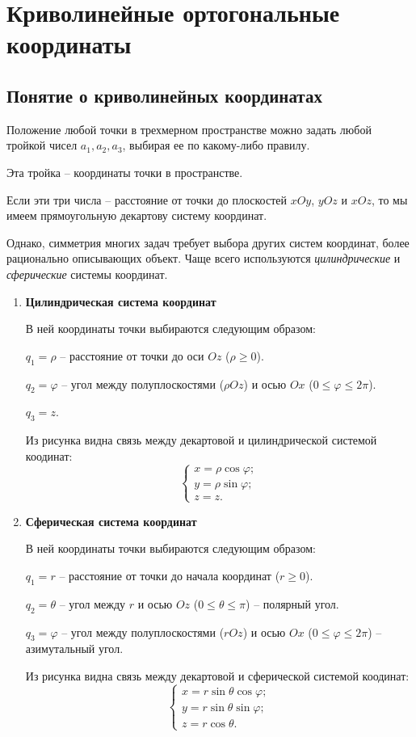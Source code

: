 \section{Криволинейные ортогональные координаты}

\subsection{Понятие о криволинейных координатах}

	Положение любой точки в трехмерном пространстве можно задать любой тройкой чисел \( a_1, a_2, a_3 \), выбирая ее по какому-либо правилу.
	
	Эта тройка -- координаты точки в пространстве.
	
	Если эти три числа -- расстояние от точки до плоскостей \( xOy \), \( yOz \) и \( xOz \), то мы имеем прямоугольную декартову систему координат.
	
	Однако, симметрия многих задач требует выбора других систем координат, более рационально описывающих объект. Чаще всего используются \textit{цилиндрические} и \textit{сферические} системы координат.
	
	\begin{enumerate}
	\item \textbf{Цилиндрическая система координат}
	
	В ней координаты точки выбираются следующим образом:
	
	\( q_1 = \rho \) -- расстояние от точки до оси \( Oz \) (\( \rho \ge 0 \)).
	
	\( q_2 = \varphi \) -- угол между полуплоскостями (\( \rho Oz \)) и осью \( Ox \) (\( 0\le \varphi \le 2\pi \)).
	
	\( q_3 = z \).
	
	Из рисунка видна связь между декартовой и цилиндрической системой коодинат:
	\[ \left\{ \begin{array}{l}
		x = \rho\cos\varphi; \\
		y = \rho\sin\varphi; \\
		z = z.
	\end{array} \right. \]
	
	\item \textbf{Сферическая система координат}
	
	В ней координаты точки выбираются следующим образом:
	
	\( q_1 = r \) -- расстояние от точки до начала координат (\( r \ge 0 \)).
	
	\( q_2 = \theta \) -- угол между \( r \) и осью \( Oz \) (\( 0\le \theta \le \pi \)) -- полярный угол.
	
	\( q_3 = \varphi \) -- угол между полуплоскостями (\( rOz \)) и осью \( Ox \) (\( 0\le \varphi \le 2\pi \)) -- азимутальный угол.
	
	Из рисунка видна связь между декартовой и сферической системой коодинат:
	\[ \left\{ \begin{array}{l}
		x = r\sin\theta\cos\varphi; \\
		y = r\sin\theta\sin\varphi; \\
		z = r\cos\theta.
	\end{array} \right. \]
	\end{enumerate}

